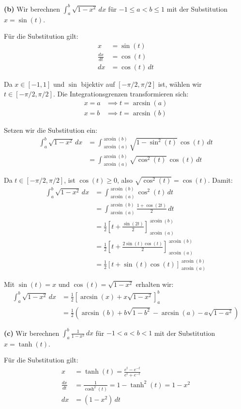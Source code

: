 \documentclass{article}
\begin{document}
\textbf{(b)} Wir berechnen $\int_a^b \sqrt{1-x^2}\,dx$ für $-1\leq a<b\leq1$ mit der Substitution $x=\sin(t)$.

Für die Substitution gilt:
\begin{align}
x &= \sin(t)\\
\frac{dx}{dt} &= \cos(t)\\
dx &= \cos(t)\,dt
\end{align}

Da $x\in[-1,1]$ und $\sin$ bijektiv auf $[-\pi/2,\pi/2]$ ist, wählen wir $t\in[-\pi/2,\pi/2]$.
Die Integrationsgrenzen transformieren sich:
\begin{align}
x = a &\implies t = \arcsin(a)\\
x = b &\implies t = \arcsin(b)
\end{align}

Setzen wir die Substitution ein:
\begin{align}
\int_a^b \sqrt{1-x^2}\,dx &= \int_{\arcsin(a)}^{\arcsin(b)} \sqrt{1-\sin^2(t)}\,\cos(t)\,dt\\
&= \int_{\arcsin(a)}^{\arcsin(b)} \sqrt{\cos^2(t)}\,\cos(t)\,dt
\end{align}

Da $t\in[-\pi/2,\pi/2]$, ist $\cos(t)\geq 0$, also $\sqrt{\cos^2(t)} = \cos(t)$. Damit:
\begin{align}
\int_a^b \sqrt{1-x^2}\,dx &= \int_{\arcsin(a)}^{\arcsin(b)} \cos^2(t)\,dt\\
&= \int_{\arcsin(a)}^{\arcsin(b)} \frac{1+\cos(2t)}{2}\,dt\\
&= \frac{1}{2}\left[t + \frac{\sin(2t)}{2}\right]_{\arcsin(a)}^{\arcsin(b)}\\
&= \frac{1}{2}\left[t + \frac{2\sin(t)\cos(t)}{2}\right]_{\arcsin(a)}^{\arcsin(b)}\\
&= \frac{1}{2}\left[t + \sin(t)\cos(t)\right]_{\arcsin(a)}^{\arcsin(b)}
\end{align}

Mit $\sin(t) = x$ und $\cos(t) = \sqrt{1-x^2}$ erhalten wir:
\begin{align}
\int_a^b \sqrt{1-x^2}\,dx &= \frac{1}{2}\left[\arcsin(x) + x\sqrt{1-x^2}\right]_a^b\\
&= \frac{1}{2}\left(\arcsin(b) + b\sqrt{1-b^2} - \arcsin(a) - a\sqrt{1-a^2}\right)
\end{align}

\textbf{(c)} Wir berechnen $\int_a^b\frac{1}{1-x^2}\,dx$ für $-1<a<b<1$ mit der Substitution $x=\tanh(t)$.

Für die Substitution gilt:
\begin{align}
x &= \tanh(t) = \frac{e^t - e^{-t}}{e^t + e^{-t}}\\
\frac{dx}{dt} &= \frac{1}{\cosh^2(t)} = 1 - \tanh^2(t) = 1 - x^2\\
dx &= (1-x^2)\,dt
\end{align}
\end{document}
